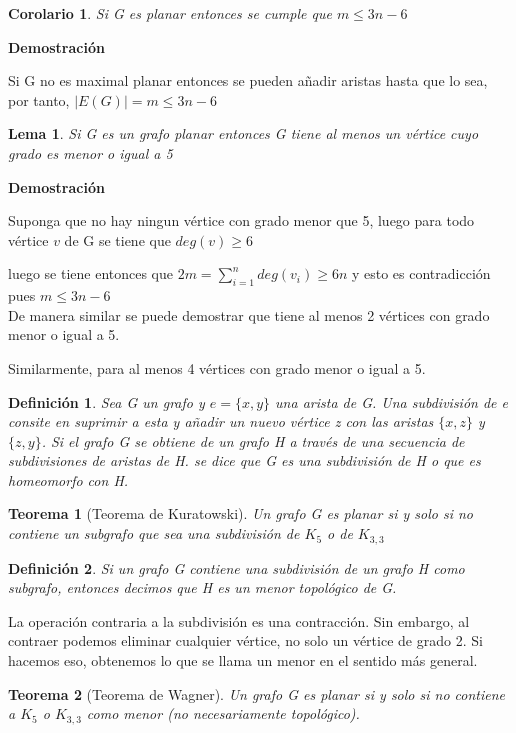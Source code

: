 \documentclass[a4paper,1pt]{report}
\newtheorem*{teo}{Teorema}
\newtheorem*{cor}{Corolario}
\newtheorem*{dfn}{Definición}
\newtheorem*{lem}{Lema}
\begin{document}
\begin{cor}
 Si G es planar entonces se cumple que $m\leq3n-6$
\end{cor}

\textbf{Demostración}

Si G no es maximal planar entonces se pueden añadir aristas hasta que lo sea, por tanto, 
$|E(G)|=m\leq3n-6$

\begin{lem}
 Si G es un grafo planar entonces G tiene al menos un vértice cuyo grado es menor o igual a 5
\end{lem}

\textbf{Demostración}

Suponga que no hay ningun vértice con grado menor que 5, luego para todo vértice $v$ de G se tiene que $deg(v)\geq 6$

luego se tiene entonces que $2m=\sum^n_{i=1} deg(v_i)\geq 6n$ y esto es contradicción pues $m\leq3n-6$\\

De manera similar se puede demostrar que tiene al menos 2 vértices con grado menor o igual a 5.

Similarmente, para al menos 4  vértices con grado menor o igual a 5.


\begin{dfn}
 Sea G un grafo y $e=\{x,y\}$ una arista de G. Una subdivisión de e consite en suprimir a esta y añadir un nuevo vértice z con las aristas $\{x,z\}$  y $\{z,y\}$. Si el grafo G se obtiene de un grafo H a través de una secuencia de subdivisiones de aristas de H. se dice que G es una subdivisión de H o que es homeomorfo con H.
\end{dfn}   

\begin{teo}[Teorema de Kuratowski]
 Un grafo G es planar si y solo si no contiene un subgrafo que sea una subdivisión de $K_5$ o de $K_{3,3}$
\end{teo}

\begin{dfn} 
Si un grafo G contiene una subdivisión de un grafo H como subgrafo, entonces decimos que H es un menor topológico de G. 
\end{dfn}

La operación contraria a la subdivisión es una contracción. Sin embargo, al contraer podemos eliminar cualquier vértice, no
solo un vértice de grado 2. Si hacemos eso, obtenemos lo que se llama un menor en el sentido más general.

\begin{teo}[Teorema de Wagner]
 Un grafo G es planar si y solo si no contiene a $K_5$ o  $K_{3,3}$  como menor (no necesariamente topológico). 
\end{teo}
\end{document}
